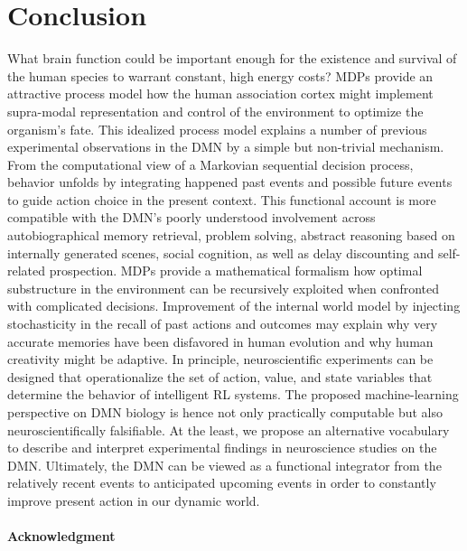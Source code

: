 \documentclass[10pt,letterpaper]{article}
\begin{document}
\section{Conclusion}
What brain function could be important enough
for the existence and survival of the human species
to warrant constant, high energy costs?
MDPs provide an attractive
process model how the human association cortex
might implement supra-modal representation and control of the environment to
optimize the organism's fate.
This idealized process model explains
a number of previous experimental observations in the
DMN by a simple but non-trivial mechanism.
%
From the computational view of a Markovian sequential decision process,
behavior unfolds by integrating happened past events
and possible future events to guide action choice in the present context.
This functional account is more compatible with the DMN's
poorly understood involvement across
autobiographical memory retrieval, problem solving,
abstract reasoning based on internally generated scenes, social cognition,
as well as delay discounting and self-related prospection.
MDPs provide a mathematical formalism how
optimal substructure in the environment can be recursively exploited
when confronted with complicated decisions.
Improvement of the internal world model
by injecting stochasticity in the recall of past
actions and outcomes may explain why
very accurate memories have been disfavored in human evolution
and why human creativity might be adaptive.
%
In principle,
neuroscientific experiments can be designed that operationalize
the set of action, value, and state variables that determine
the behavior of intelligent RL systems.
The proposed machine-learning perspective
on DMN biology is hence not only practically computable but
also neuroscientifically falsifiable.
At the least, we propose an alternative vocabulary to
describe and interpret experimental findings in neuroscience studies
on the DMN.
%
Ultimately,
the DMN can be viewed as a functional integrator
from the relatively recent events to anticipated upcoming events
in order to constantly improve present action in our dynamic world.



\paragraph{Acknowledgment}
\end{document}

